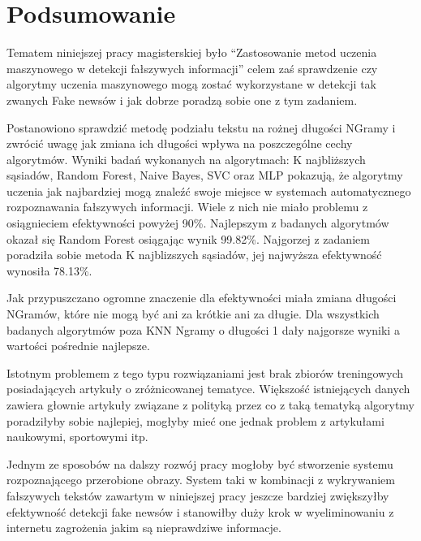 \chapter{Podsumowanie}
Tematem niniejszej pracy magisterskiej było 
``Zastosowanie metod uczenia maszynowego w detekcji fałszywych informacji'' 
celem zaś sprawdzenie czy algorytmy uczenia maszynowego mogą zostać wykorzystane
w detekcji tak zwanych Fake newsów i jak dobrze poradzą sobie one z tym zadaniem.


Postanowiono sprawdzić metodę podziału tekstu na rożnej długości NGramy i zwrócić uwagę 
jak zmiana ich długości wpływa na poszczególne cechy algorytmów.
Wyniki badań wykonanych na algorytmach: K najbliższych sąsiadów, Random Forest, Naive Bayes,
SVC oraz MLP pokazują, że algorytmy uczenia jak najbardziej mogą znaleźć swoje miejsce w systemach
automatycznego rozpoznawania fałszywych informacji. Wiele z nich nie miało problemu z osiągnieciem 
efektywności powyżej 90\%. Najlepszym z badanych algorytmów okazał się Random Forest osiągając
wynik 99.82\%. Najgorzej z zadaniem poradziła sobie metoda K najblizszych sąsiadów, jej najwyższa 
efektywność wynosiła 78.13\%.

Jak przypuszczano ogromne znaczenie dla efektywności
miała zmiana długości NGramów, które nie mogą być ani za krótkie ani za długie.
Dla wszystkich badanych algorytmów poza KNN Ngramy o długości 1 dały najgorsze wyniki a wartości
pośrednie najlepsze.

Istotnym problemem z tego typu rozwiązaniami jest brak zbiorów treningowych posiadających 
artykuły o zróżnicowanej tematyce. Większość istniejących danych zawiera głownie artykuły związane z 
polityką przez co z taką tematyką algorytmy poradziłyby sobie najlepiej, mogłyby mieć one jednak problem 
z artykułami naukowymi, sportowymi itp.

Jednym ze sposobów na dalszy rozwój pracy mogłoby być stworzenie systemu rozpoznającego 
przerobione obrazy. System taki w kombinacji z wykrywaniem fałszywych tekstów zawartym
w niniejszej pracy jeszcze bardziej zwiększyłby efektywność detekcji fake newsów i stanowiłby 
duży krok w wyeliminowaniu z internetu zagrożenia jakim są nieprawdziwe informacje.